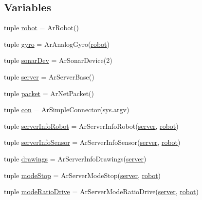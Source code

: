 \subsection*{Variables}
\begin{DoxyCompactItemize}
\item 
tuple \hyperlink{namespaceservidor_a20c40528942a814c3ba639d6fdf80c34}{robot} = ArRobot()
\item 
tuple \hyperlink{namespaceservidor_a73a7e14af1c6774da1d3c5580e02573c}{gyro} = ArAnalogGyro(\hyperlink{namespaceservidor_a20c40528942a814c3ba639d6fdf80c34}{robot})
\item 
tuple \hyperlink{namespaceservidor_a509c8beb9fe73900b5ab2a0fc5f793b2}{sonarDev} = ArSonarDevice(2)
\item 
tuple \hyperlink{namespaceservidor_adfced13b57fb69c12f8ab5a84d1a2356}{server} = ArServerBase()
\item 
tuple \hyperlink{namespaceservidor_a159e1bd236b55d72f3fd3cb94afc7650}{packet} = ArNetPacket()
\item 
tuple \hyperlink{namespaceservidor_ae78d17158a0f45369b3621468e736bf6}{con} = ArSimpleConnector(sys.argv)
\item 
tuple \hyperlink{namespaceservidor_a214f853047fdc2f26cfac0db1a9e87b8}{serverInfoRobot} = ArServerInfoRobot(\hyperlink{namespaceservidor_adfced13b57fb69c12f8ab5a84d1a2356}{server}, \hyperlink{namespaceservidor_a20c40528942a814c3ba639d6fdf80c34}{robot})
\item 
tuple \hyperlink{namespaceservidor_ae93d5f481f48442f0db6959867fbf8c4}{serverInfoSensor} = ArServerInfoSensor(\hyperlink{namespaceservidor_adfced13b57fb69c12f8ab5a84d1a2356}{server}, \hyperlink{namespaceservidor_a20c40528942a814c3ba639d6fdf80c34}{robot})
\item 
tuple \hyperlink{namespaceservidor_a691fe74e57a668507d56d3acd8e19ba2}{drawings} = ArServerInfoDrawings(\hyperlink{namespaceservidor_adfced13b57fb69c12f8ab5a84d1a2356}{server})
\item 
tuple \hyperlink{namespaceservidor_ae7b0d696eea14b76aba1e014dbfe70f4}{modeStop} = ArServerModeStop(\hyperlink{namespaceservidor_adfced13b57fb69c12f8ab5a84d1a2356}{server}, \hyperlink{namespaceservidor_a20c40528942a814c3ba639d6fdf80c34}{robot})
\item 
tuple \hyperlink{namespaceservidor_ac7cf650e754b329444bd902af26c1527}{modeRatioDrive} = ArServerModeRatioDrive(\hyperlink{namespaceservidor_adfced13b57fb69c12f8ab5a84d1a2356}{server}, \hyperlink{namespaceservidor_a20c40528942a814c3ba639d6fdf80c34}{robot})
\item 

\end{DoxyCompactItemize}
